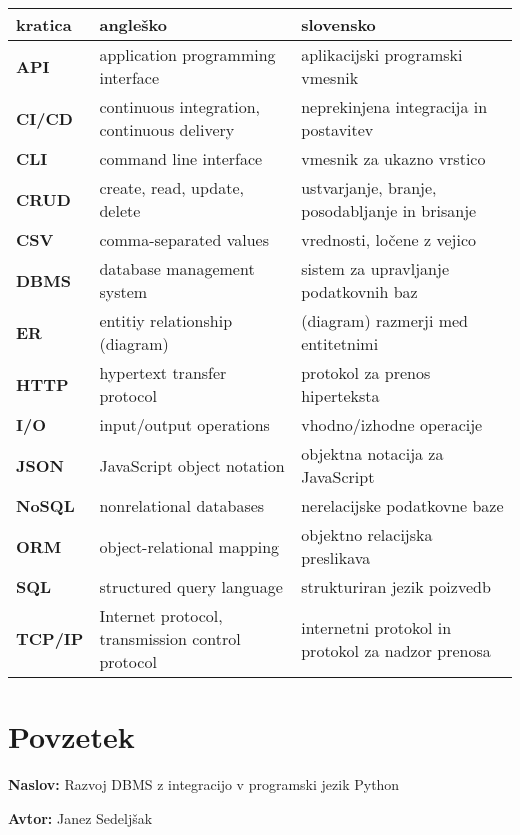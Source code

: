 \documentclass[a4paper,12pt,openright]{book}
\newcommand{\ttitle}{Razvoj DBMS z integracijo v programski jezik Python}
\newcommand{\tauthor}{Janez Sedeljšak}
\newcommand{\clearemptydoublepage}{\newpage{\pagestyle{empty}\cleardoublepage}}
\begin{document}
\noindent\begin{tabular}{p{}|p{}|p{}}
  {\bf kratica} & {\bf angleško}                              & {\bf slovensko} \\ \hline
  {\bf API} & application programming interface & aplikacijski programski vmesnik \\
  {\bf CI/CD} & continuous integration, continuous delivery & neprekinjena integracija in postavitev \\
  {\bf CLI} & command line interface & vmesnik za ukazno vrstico \\
  {\bf CRUD} & create, read, update, delete & ustvarjanje, branje, posodabljanje in brisanje \\
  {\bf CSV} & comma-separated values & vrednosti, ločene z vejico \\
  {\bf DBMS} & database management system & sistem za upravljanje podatkovnih baz \\
  {\bf ER} & entitiy relationship (diagram) & (diagram) razmerji med entitetnimi \\
  {\bf HTTP} & hypertext transfer protocol & protokol za prenos hiperteksta \\
  {\bf I/O} & input/output operations & vhodno/izhodne operacije \\
  {\bf JSON} & JavaScript object notation & objektna notacija za JavaScript \\
  {\bf NoSQL} & nonrelational databases & nerelacijske podatkovne baze \\
  {\bf ORM} & object-relational mapping & objektno relacijska preslikava \\
  {\bf SQL} & structured query language & strukturiran jezik poizvedb \\
  {\bf TCP/IP} & Internet protocol, transmission control protocol & internetni protokol in protokol za nadzor prenosa \\
\end{tabular}


\clearemptydoublepage

{}
\chapter*{Povzetek}

\noindent\textbf{Naslov:} \ttitle
\bigskip

\noindent\textbf{Avtor:} \tauthor
\bigskip
\end{document}
